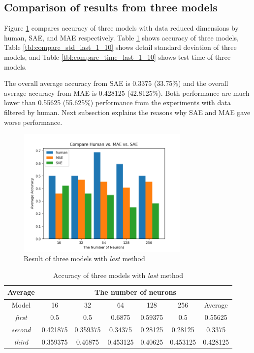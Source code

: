 \documentclass[draft,dvipsnames]{drexel-thesis}
\begin{document}
\begin{thesis}
\subsection{Comparison of results from three models}
Figure \ref{fig:compare_result_last_1_10} compares accuracy of three models with data reduced dimensions by human, SAE, and MAE respectively. Table \ref{tbl:compare_accuracy_last_1_10} shows accuracy of three models, Table \ref{tbl:compare_std_last_1_10} shows detail standard deviation of three models, and Table \ref{tbl:compare_time_last_1_10} shows test time of three models. 

The overall average accuracy from SAE is 0.3375 (33.75\%) and the overall average accuracy from MAE is 0.428125 (42.8125\%). Both performance are much lower than 0.55625 (55.625\%) performance from the experiments with data filtered by human. Next subsection explains the reasons why SAE and MAE gave worse performance.

\begin{figure}[t!]
    \centering
    \includegraphics[width=0.75\textwidth]{pictures/result_pictures/compare_result_last_1_10.png}
    \caption{Result of three models with {\em last} method}
    \label{fig:compare_result_last_1_10}
\end{figure}

\begin{table}[!t]
\centering
\caption{Accuracy of three models with {\em last} method}
\label{tbl:compare_accuracy_last_1_10}
\begin{tabular}{|c|c|c|c|c|c|c|}
\hline
Average         & \multicolumn{6}{c|}{The number of neurons}                     \\ \hline
Model           & 16       & 32       & 64       & 128     & 256      & Average  \\ \hline
\textit{first}  & 0.5      & 0.5      & 0.6875   & 0.59375 & 0.5      & 0.55625  \\ \hline
\textit{second} & 0.421875 & 0.359375 & 0.34375  & 0.28125 & 0.28125  & 0.3375   \\ \hline
\textit{third}  & 0.359375 & 0.46875  & 0.453125 & 0.40625 & 0.453125 & 0.428125 \\ \hline
\end{tabular}
\end{table}


\end{thesis}
\end{document}
